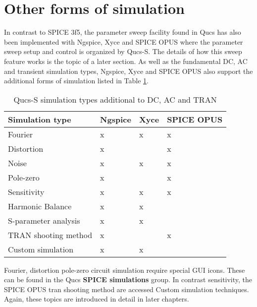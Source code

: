 \section{Other forms of simulation}
In contrast to SPICE 3f5, the parameter sweep facility found in Qucs has also been implemented with Ngspice, Xyce and SPICE OPUS where the parameter sweep setup and control is organized by Qucs-S.  The details of how this sweep feature works is the topic of a later section. As well as the fundamental DC, AC and transient simulation types, Ngspice, Xyce and SPICE OPUS also support the additional forms of simulation listed in Table \ref{Table3}.
\begin{table} [h]
	\centering
	\caption{Qucs-S  simulation types additional to DC, AC and TRAN}
	\label{Table3}
	\begin{tabular}  {|l|l|l|l|} \hline
		\textbf{Simulation type} & \textbf{Ngspice} & \textbf{Xyce}   & \textbf{SPICE OPUS} \\
		\hline
		Fourier               &   x    &    x     &   x       \\
		Distortion            &   x    &          &   x       \\
		Noise                 &   x    &    x     &   x       \\
		Pole-zero             &   x    &          &   x       \\
		Sensitivity           &   x    &    x     &   x       \\
		Harmonic Balance      &   x    &    x     &           \\
		S-parameter analysis  &   x    &    x     &           \\
		TRAN shooting method  &   x    &          &   x       \\
		Custom simulation     &   x    &    x     &           \\
		\hline
	\end{tabular}
\end{table}
\noindent Fourier, distortion pole-zero circuit simulation require special GUI icons. These can be found in the Qucs \textbf{SPICE simulations} group.  In contrast sensitivity, the SPICE OPUS tran shooting method are accessed Custom simulation techniques. Again, these topics are introduced in detail in later chapters.


